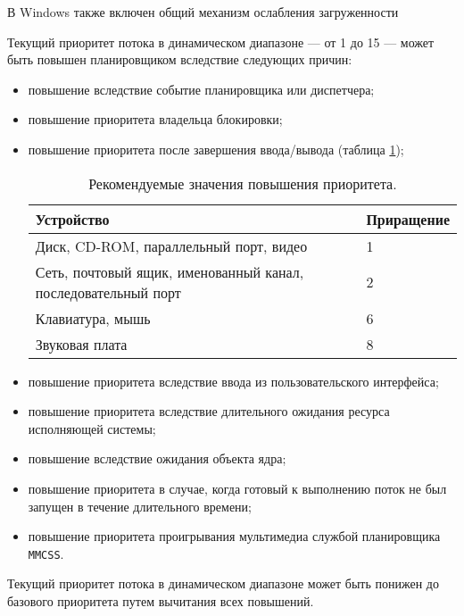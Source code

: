 В Windows также включен общий механизм ослабления загруженности 

Текущий приоритет потока в динамическом диапазоне --- от 1 до 15 --- может быть
повышен планировщиком вследствие следующих причин:

\begin{itemize}
    \item повышение вследствие событие планировщика или диспетчера;
    \item повышение приоритета владельца блокировки;
    \item повышение приоритета после завершения ввода/вывода (таблица
          \ref{tab:io});
\begin{table}[h]
    \caption{Рекомендуемые значения повышения приоритета.}
    \begin{center}
        \begin{tabular}{|p{100mm}|l|}
            \hline
            \textbf{Устройство} & \textbf{Приращение} \\
            \hline
            Диск, CD-ROM, параллельный порт, видео & 1 \\
            \hline
            Сеть, почтовый ящик, именованный канал, последовательный порт & 2 \\
            \hline
            Клавиатура, мышь & 6 \\
            \hline
            Звуковая плата & 8 \\
            \hline
        \end{tabular}
    \end{center}
    \label{tab:io}
\end{table}
    \item повышение приоритета вследствие ввода из пользовательского интерфейса;
    \item повышение приоритета вследствие длительного ожидания ресурса
          исполняющей системы;
    \item повышение вследствие ожидания объекта ядра;
    \item повышение приоритета в случае, когда готовый к выполнению поток не
          был запущен в течение длительного времени;
    \item повышение приоритета проигрывания мультимедиа службой планировщика
          \texttt{MMCSS}.
\end{itemize}



Текущий приоритет потока в динамическом диапазоне может быть понижен до
базового приоритета путем вычитания всех повышений.

